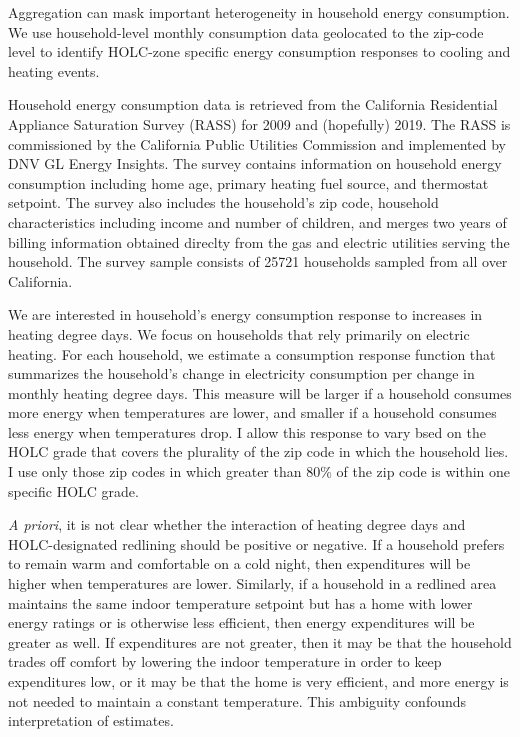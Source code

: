 \documentclass[
]{article}
\begin{document}
Aggregation can mask important heterogeneity in household energy
consumption. We use household-level monthly consumption data geolocated
to the zip-code level to identify HOLC-zone specific energy consumption
responses to cooling and heating events.

Household energy consumption data is retrieved from the California
Residential Appliance Saturation Survey (RASS) for 2009 and (hopefully)
2019. The RASS is commissioned by the California Public Utilities
Commission and implemented by DNV GL Energy Insights. The survey
contains information on household energy consumption including home age,
primary heating fuel source, and thermostat setpoint. The survey also
includes the household's zip code, household characteristics including
income and number of children, and merges two years of billing
information obtained direclty from the gas and electric utilities
serving the household. The survey sample consists of 25721 households
sampled from all over California.

We are interested in household's energy consumption response to
increases in heating degree days. We focus on households that rely
primarily on electric heating. For each household, we estimate a
consumption response function that summarizes the household's change in
electricity consumption per change in monthly heating degree days. This
measure will be larger if a household consumes more energy when
temperatures are lower, and smaller if a household consumes less energy
when temperatures drop. I allow this response to vary bsed on the HOLC
grade that covers the plurality of the zip code in which the household
lies. I use only those zip codes in which greater than 80\% of the zip
code is within one specific HOLC grade.

\emph{A priori}, it is not clear whether the interaction of heating
degree days and HOLC-designated redlining should be positive or
negative. If a household prefers to remain warm and comfortable on a
cold night, then expenditures will be higher when temperatures are
lower. Similarly, if a household in a redlined area maintains the same
indoor temperature setpoint but has a home with lower energy ratings or
is otherwise less efficient, then energy expenditures will be greater as
well. If expenditures are not greater, then it may be that the household
trades off comfort by lowering the indoor temperature in order to keep
expenditures low, or it may be that the home is very efficient, and more
energy is not needed to maintain a constant temperature. This ambiguity
confounds interpretation of estimates.
\end{document}
